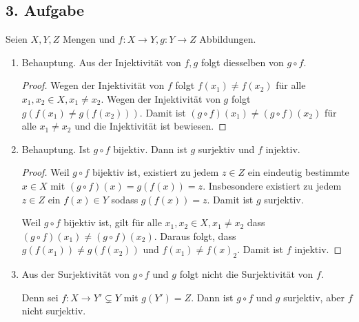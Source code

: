 \documentclass[a5paper]{article}
\theoremstyle{remark}
\begin{document}
\subsection*{3. Aufgabe}
Seien \(X, Y, Z\) Mengen und \(f\colon X \to Y, g \colon Y \to Z\) Abbildungen.
\begin{enumerate}
\item Behauptung.  Aus der Injektivität von \(f, g\) folgt diesselben
  von \(g \circ f\).
  \begin{proof}
    Wegen der Injektivität von \(f\) folgt \(f(x_{1}) \ne f(x_{2})\) für
    alle \(x_{1}, x_{2} \in X, x_{1} \ne x_{2}\).  Wegen der Injektivität
    von \(g\) folgt \(g(f(x_{1}) \ne g(f(x_{2})))\).  Damit ist \((g \circ f)
    (x_{1}) \ne (g \circ f)(x_{2}) \) für alle \(x_{1} \ne x_{2}\) und die
    Injektivität ist bewiesen.
  \end{proof}
\item Behauptung.  Ist \(g \circ f\) bijektiv.  Dann ist \(g\) surjektiv und
  \(f\) injektiv.
  \begin{proof}
    Weil \(g \circ f\) bijektiv ist, existiert zu jedem \(z \in Z\) ein
    eindeutig bestimmte \(x \in X\) mit \((g \circ f)(x) = g(f(x))= z\).
    Insbesondere existiert zu jedem \(z \in Z\) ein \(f(x) \in Y\) sodass
    \(g(f(x)) = z\).  Damit ist \(g\) surjektiv.

    Weil \(g \circ f\) bijektiv ist, gilt für alle \(x_{1}, x_{2} \in X, x_{1}
    \ne x_{2}\) dass \((g \circ f)(x_{1}) \ne (g \circ f)(x_{2})\).  Daraus folgt,
    dass \(g(f(x_{1})) \ne g(f(x_{2}))\) und \(f(x_{1}) \ne f(x)_{2}\).  Damit
    ist \(f\) injektiv.
  \end{proof}
\item Aus der Surjektivität von \(g \circ f\) und \(g\) folgt nicht die
  Surjektivität von \(f\).

  Denn sei \(f\colon X \to Y' \subsetneq Y\) mit \(g(Y') = Z\).  Dann ist \(g \circ f\) und \(g\)
  surjektiv, aber \(f\) nicht surjektiv.
\end{enumerate}
\end{document}
